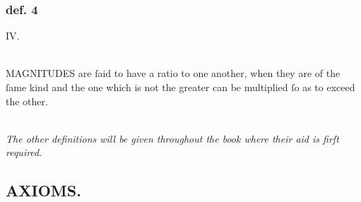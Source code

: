 \begin{center}
\begin{minipage}{0.8\textwidth}
        \subsubsection{def. 4}
        \begin{center}
            IV.\label{book5def4}\\
            \hfill\\
            \raggedright M\textsc{AGNITUDES} are ſaid to have a ratio to one another, when they are of the ſame kind and the one which is not the greater can be multiplied ſo as to exceed the other.
        \end{center}
        \hfill\\
        \textit{The other definitions will be given throughout the book where their aid is firſt required}.
    \end{minipage}
\end{center}

\newpage

\subsection[Axioms]{\centering \scshape{\LARGE{AXIOMS.}}}
\label{subsec:axioms}

